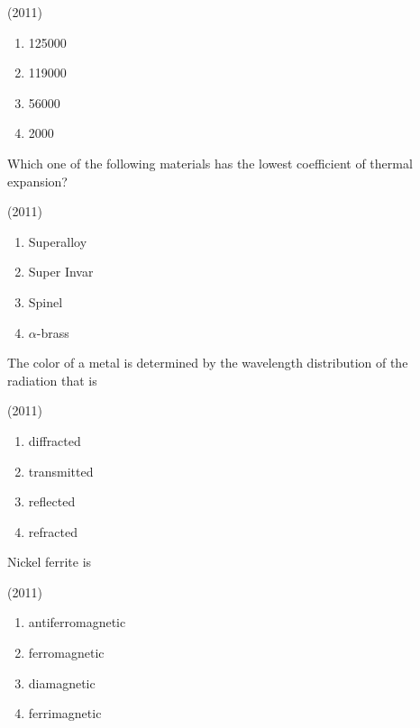     \hfill{(2011)}

        \begin{multicols}{4}
            \begin{enumerate}
                \item 125000
                \item 119000
                \item 56000
                \item 2000
            \end{enumerate}
        \end{multicols}

    \item Which one of the following materials has the lowest coefficient of thermal expansion?
    
    \hfill{(2011)}

        \begin{multicols}{4}
            \begin{enumerate}
                \item Superalloy
                \item Super Invar
                \item Spinel
                \item $\alpha$-brass
            \end{enumerate}
        \end{multicols}
        
    \item The color of a metal is determined by the wavelength distribution of the radiation that is
    
    \hfill{(2011)}

        \begin{multicols}{4}
            \begin{enumerate}
                \item diffracted
                \item transmitted
                \item reflected
                \item refracted
            \end{enumerate}
        \end{multicols}

    \item Nickel ferrite is
    
    \hfill{(2011)}

        \begin{multicols}{4}
            \begin{enumerate}
                \item antiferromagnetic
                \item ferromagnetic
                \item diamagnetic
                \item ferrimagnetic
            \end{enumerate}
        \end{multicols}
        
